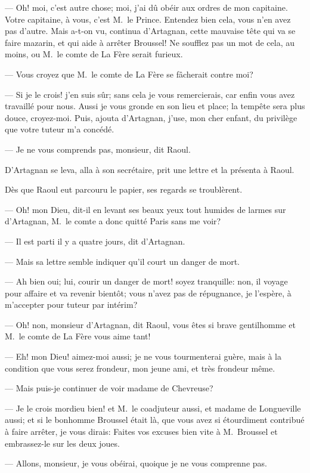 — Oh! moi, c'est autre chose; moi, j'ai dû obéir aux ordres de mon capitaine. Votre capitaine, à vous, c'est M.~le Prince. Entendez bien cela, vous n'en avez pas d'autre. Mais a-t-on vu, continua d'Artagnan, cette mauvaise tête qui va se faire mazarin, et qui aide à arrêter Broussel! Ne soufflez pas un mot de cela, au moins, ou M.~le comte de La Fère serait furieux.

— Vous croyez que M.~le comte de La Fère se fâcherait contre moi?

— Si je le crois! j'en suis sûr; sans cela je vous remercierais, car enfin vous avez travaillé pour nous. Aussi je vous gronde en son lieu et place; la tempête sera plus douce, croyez-moi. Puis, ajouta d'Artagnan, j'use, mon cher enfant, du privilège que votre tuteur m'a concédé.

— Je ne vous comprends pas, monsieur, dit Raoul.

D'Artagnan se leva, alla à son secrétaire, prit une lettre et la présenta à Raoul.

Dès que Raoul eut parcouru le papier, ses regards se troublèrent.

— Oh! mon Dieu, dit-il en levant ses beaux yeux tout humides de larmes sur d'Artagnan, M.~le comte a donc quitté Paris sans me voir?

— Il est parti il y a quatre jours, dit d'Artagnan.

— Mais sa lettre semble indiquer qu'il court un danger de mort.

— Ah bien oui; lui, courir un danger de mort! soyez tranquille: non, il voyage pour affaire et va revenir bientôt; vous n'avez pas de répugnance, je l'espère, à m'accepter pour tuteur par intérim?

— Oh! non, monsieur d'Artagnan, dit Raoul, vous êtes si brave gentilhomme et M.~le comte de La Fère vous aime tant!

— Eh! mon Dieu! aimez-moi aussi; je ne vous tourmenterai guère, mais à la condition que vous serez frondeur, mon jeune ami, et très frondeur même.

— Mais puis-je continuer de voir madame de Chevreuse?

— Je le crois mordieu bien! et M.~le coadjuteur aussi, et madame de Longueville aussi; et si le bonhomme Broussel était là, que vous avez si étourdiment contribué à faire arrêter, je vous dirais: Faites vos excuses bien vite à M.~Broussel et embrassez-le sur les deux joues.

— Allons, monsieur, je vous obéirai, quoique je ne vous comprenne pas.

